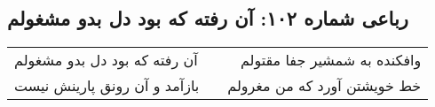 \begin{center}
\section*{رباعی شماره ۱۰۲: آن رفته که بود دل بدو مشغولم}
\label{sec:102}
\begin{longtable}{l p{0.5cm} r}
آن رفته که بود دل بدو مشغولم
&&
وافکنده به شمشیر جفا مقتولم
\\
بازآمد و آن رونق پارینش نیست
&&
خط خویشتن آورد که من مغرولم
\\
\end{longtable}
\end{center}
